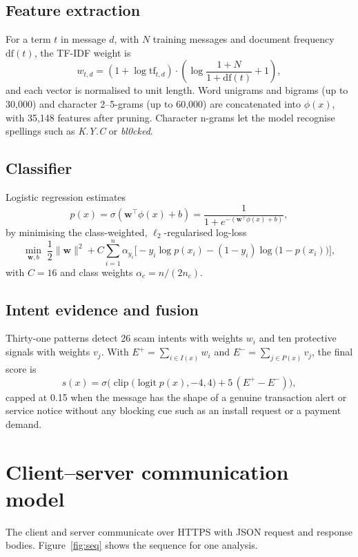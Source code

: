\documentclass[12pt,a4paper]{report}
\begin{document}
\subsection{Feature extraction}
For a term $t$ in message $d$, with $N$ training messages and document frequency $\mathrm{df}(t)$, the TF-IDF weight is
\begin{equation}
w_{t,d}=\left(1+\log \mathrm{tf}_{t,d}\right)\cdot\left(\log\frac{1+N}{1+\mathrm{df}(t)}+1\right),
\end{equation}
and each vector is normalised to unit length. Word unigrams and bigrams (up to 30,000) and character 2--5-grams (up to 60,000) are concatenated into $\phi(x)$, with 35,148 features after pruning. Character n-grams let the model recognise spellings such as \textit{K.Y.C} or \textit{bl0cked}.

\subsection{Classifier}
Logistic regression estimates
\begin{equation}
p(x)=\sigma\!\left(\mathbf{w}^{\top}\phi(x)+b\right)=\frac{1}{1+e^{-(\mathbf{w}^{\top}\phi(x)+b)}},
\end{equation}
by minimising the class-weighted, $\ell_2$-regularised log-loss
\begin{equation}
\min_{\mathbf{w},b}\;\frac{1}{2}\|\mathbf{w}\|^2 + C\sum_{i=1}^{n}\alpha_{y_i}\Big[-y_i\log p(x_i)-(1-y_i)\log\big(1-p(x_i)\big)\Big],
\end{equation}
with $C=16$ and class weights $\alpha_c=n/(2n_c)$.

\subsection{Intent evidence and fusion}
Thirty-one patterns detect 26 scam intents with weights $w_i$ and ten protective signals with weights $v_j$. With $E^{+}=\sum_{i\in I(x)}w_i$ and $E^{-}=\sum_{j\in P(x)}v_j$, the final score is
\begin{equation}
s(x)=\sigma\!\Big(\operatorname{clip}\big(\operatorname{logit}p(x),-4,4\big)+5\,(E^{+}-E^{-})\Big),
\end{equation}
capped at 0.15 when the message has the shape of a genuine transaction alert or service notice without any blocking cue such as an install request or a payment demand.

\section{Client--server communication model}
The client and server communicate over HTTPS with JSON request and response bodies. Figure~\ref{fig:seq} shows the sequence for one analysis.
\end{document}
